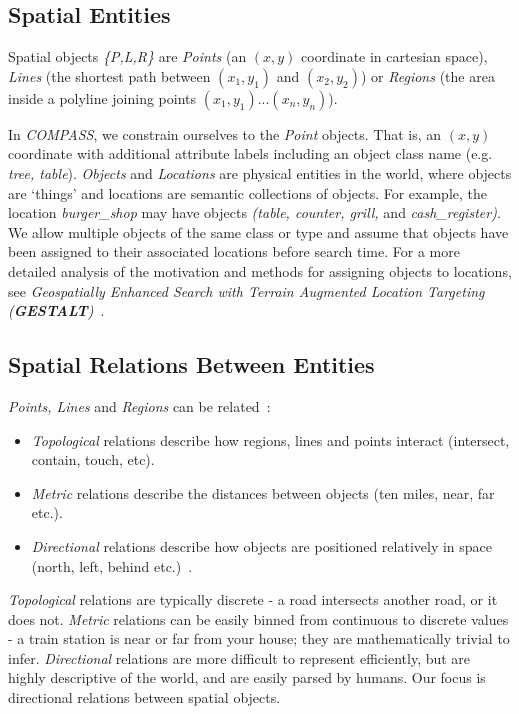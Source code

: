 \subsection{Spatial Entities}
\par{
    Spatial objects \textit{\{P,L,R\}} are \textit{Points} (an $(x,y)$ coordinate in cartesian space), \textit{Lines} (the shortest path between $(x_{1},y_{1})$ and $(x_{2},{y}_{2})$) or \textit{Regions} (the area inside a polyline joining points $(x_{1},y_{1}) ... (x_{n},y_{n})$).
}
\par{
    In \emph{COMPASS}, we constrain ourselves to the \textit{Point} objects. That is, an $(x,y)$ coordinate with additional attribute labels including an object class name (e.g. \textit{tree, table}).
    \textit{Objects} and \textit{Locations} are physical entities in the world, where objects are `things' and locations are semantic collections of objects. For example, the location \textit{burger\_shop} may have objects \textit{(table, counter, grill,} and \textit{cash\_register)}.
    We allow multiple objects of the same class or type and assume that objects have been assigned to their associated locations before search time.
    For a more detailed analysis of the motivation and methods for assigning objects to locations, see \textit{Geospatially Enhanced Search with Terrain Augmented Location Targeting (\textbf{GESTALT})}~\cite{Osul2023}.
}


\subsection{Spatial Relations Between Entities}
\par{
     \textit{Points, Lines} and \textit{Regions} can be related~\cite{Carniel2020,Bertella2022,Carniel2023}:
    \begin{itemize}
        \item \textit{Topological} relations describe how regions, lines and points interact (intersect, contain, touch, etc).
        \item \textit{Metric} relations describe the distances between objects (ten miles, near, far etc.).
        \item \textit{Directional} relations describe how objects are positioned relatively in space (north, left, behind etc.)~\cite{Carniel2020,Bertella2022,Carniel2023}.
    \end{itemize}

    \textit{Topological} relations are typically discrete - a road intersects another road, or it does not. 
    \textit{Metric} relations can be easily binned from continuous to discrete values - a train station is near or far from your house; they are mathematically trivial to infer.
    \textit{Directional} relations are more difficult to represent efficiently, but are highly descriptive of the world, and are easily parsed by humans. 
    Our focus is directional relations between spatial objects. 
}

